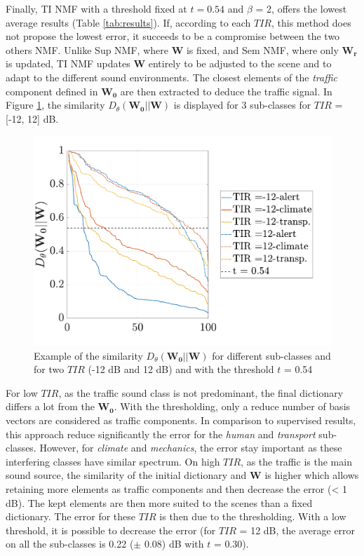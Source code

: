 \documentclass[twocolumn,a4paper,10pt]{article}
\begin{document}
Finally, TI NMF with a threshold fixed at $t = 0.54$ and $\beta$ = 2, offers the lowest average results (Table \ref{tab:results}). If, according to each $TIR$, this method does not propose the lowest error, it succeeds to be a compromise between the two others NMF. Unlike Sup NMF, where $\mathbf{W}$ is fixed, and Sem NMF, where only $\mathbf{W_r}$ is updated, TI NMF updates $\mathbf{W}$ entirely to be adjusted to the scene and to adapt to the different sound environments. The closest elements of the \textit{traffic} component defined in $\mathbf{W_0}$ are then extracted to deduce the traffic signal. In Figure \ref{fig:dist_-12_12}, the similarity $D_{\theta}(\mathbf{W_0}||\mathbf{W})$ is displayed for 3 sub-classes for $TIR$ = [-12, 12] dB.

\begin{figure}[t]
    \centering
    \includegraphics[width=\linewidth]{figures/dist_-12_12.pdf}
    \caption{Example of the similarity $D_{\theta}\left( \mathbf{W_0} \vert \vert \mathbf{W}\right)$ for different sub-classes and for two $TIR$ (-12 dB and 12 dB) and with the threshold $t$ = 0.54}
    \label{fig:dist_-12_12}
\end{figure}

For low $TIR$, as the traffic sound class is not predominant, the final dictionary differs a lot from the $\mathbf{W_0}$. With the thresholding, only a reduce number of basis vectors are considered as traffic components. In comparison to supervised results, this approach reduce significantly the error for the \textit{human} and \textit{transport} sub-classes.  However, for \textit{climate} and \textit{mechanics}, the error stay important as these interfering classes have similar spectrum. On high $TIR$, as the traffic is the main sound source, the similarity of the initial dictionary and $\mathbf{W}$ is higher which allows retaining more elements as traffic components and then decrease the error (< 1 dB). The kept elements are then more suited to the scenes than a fixed dictionary. The error for these $TIR$ is then due to the thresholding. With a low threshold, it is possible to decrease the error (for $TIR$ = 12 dB, the average error on all the sub-classes is 0.22 ($\pm$ 0.08) dB with $t$ = 0.30).
\end{document}
